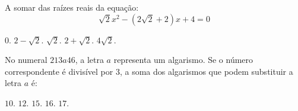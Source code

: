 \begin{question}%
A somar das raízes reais da equação:
\[\sqrt{2} x^2 - (2\sqrt{2} + 2)x + 4 = 0\]
    \begin{tasks}
        \task \(0\).
        \task \(2 - \sqrt{2}\).
        \task \(\sqrt{2}\).
        \task \(2 + \sqrt{2}\).
        \task \(4\sqrt{2}\).
    \end{tasks}
\end{question}

\begin{question}%
No numeral \(213a46\), a letra \(a\) representa um algarismo. Se o número correspondente é divisível por 3, a soma dos algarismos que podem substituir a letra \(a\) é:
    \begin{tasks}
        \task \(10\).
        \task \(12\).
        \task \(15\).
        \task \(16\).
        \task \(17\).
    \end{tasks}
\end{question}
